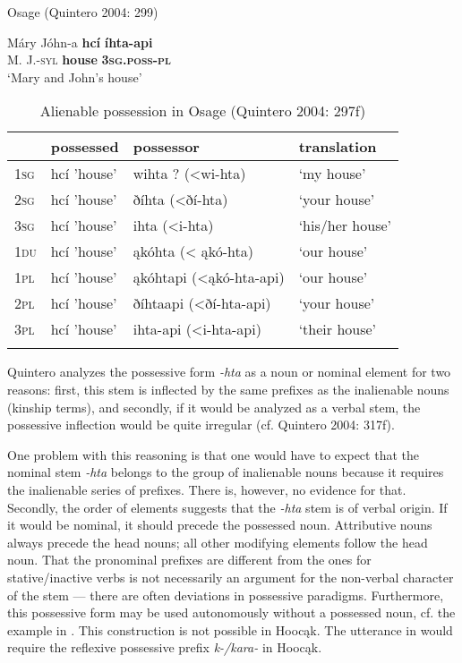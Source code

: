 \documentclass[output=paper]{LSP/langsci}
\begin{document}
\ex Osage (Quintero 2004: 299) \label{osagemaryandjohn}

\gll Máry Jóhn-a  \textbf{hc\'i}  \textbf{íhta-api} \\
M.      J.-\textsc{syl}   \textbf{house} \textbf{\textsc{3sg.poss-pl}} \\
\glt `Mary and John's house'
\z

\begin{table}
\caption{Alienable possession in Osage (Quintero 2004: 297f)} \label{osagealienableposs}
\begin{tabular}[h!]{ l l l l }
\lsptoprule
& possessed & possessor & translation \\
\midrule
\textsc{1sg} & hcí  'house'	& wihta ? (<wi-hta) & `my house' \\
 
\textsc{2sg} & hcí  'house'	& ðíhta (<ðí-hta)	& `your house' \\
 
\textsc{3sg} & hcí  'house'	& ihta (<i-hta)	& `his/her house' \\
 
\textsc{1du} & hcí  'house' & ąkóhta (< ąkó-hta) & `our house' \\
 
\textsc{1pl} & hcí  'house' & ąkóhtapi (<ąkó-hta-api) & `our house' \\
 
\textsc{2pl} & hcí  'house' & ðíhtaapi (<ðí-hta-api) & `your house' \\
 
\textsc{3pl} & hcí  'house' & ihta-api (<i-hta-api) & `their house' \\
\lspbottomrule
\end{tabular}
\end{table}

Quintero analyzes the possessive form \textit{-hta} as a noun or nominal element for two reasons: first, this stem is inflected by the same prefixes as the inalienable nouns (kinship terms), and secondly, if it would be analyzed as a verbal stem, the possessive inflection would be quite irregular (cf. Quintero 2004: 317f). 

One problem with this reasoning is that one would have to expect that the nominal stem \textit{-hta} belongs to the group of inalienable nouns because it requires the inalienable series of prefixes. There is, however, no evidence for that. Secondly, the order of elements suggests that the \textit{-hta} stem is of verbal origin. If it would be nominal, it should precede the possessed noun. Attributive nouns always precede the head nouns; all other modifying elements follow the head noun. That the pronominal prefixes are different from the ones for stative/inactive verbs is not necessarily an argument for the non-verbal character of the stem --- there are often deviations in possessive paradigms. Furthermore, this possessive form may be used autonomously without a possessed noun, cf. the example in . This construction is not possible in Hoocąk. The utterance in  would require the reflexive possessive prefix \textit{k-/kara-} in Hoocąk.
\end{document}
